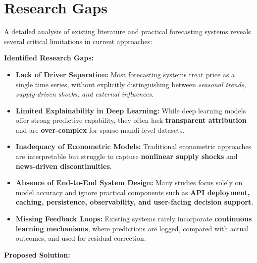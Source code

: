 \documentclass[12pt,a4paper]{report}
\begin{document}
\section{Research Gaps}

\noindent
A detailed analysis of existing literature and practical forecasting systems reveals several critical limitations in current approaches:
\vspace{0.5em}

\noindent
\textbf{Identified Research Gaps:}

\begin{itemize}
    \item \textbf{Lack of Driver Separation:}  
    Most forecasting systems treat price as a single time series, without explicitly distinguishing between \textit{seasonal trends, supply-driven shocks, and external influences}.

    \item \textbf{Limited Explainability in Deep Learning:}  
    While deep learning models offer strong predictive capability, they often lack \textbf{transparent attribution} and are \textbf{over-complex} for sparse mandi-level datasets.

    \item \textbf{Inadequacy of Econometric Models:}  
    Traditional econometric approaches are interpretable but struggle to capture \textbf{nonlinear supply shocks} and \textbf{news-driven discontinuities}.

    \item \textbf{Absence of End-to-End System Design:}  
    Many studies focus solely on model accuracy and ignore practical components such as \textbf{API deployment, caching, persistence, observability, and user-facing decision support}.

    \item \textbf{Missing Feedback Loops:}  
    Existing systems rarely incorporate \textbf{continuous learning mechanisms}, where predictions are logged, compared with actual outcomes, and used for residual correction.
\end{itemize}

\vspace{0.7em}

\noindent
\textbf{Proposed Solution:}  

\vspace{0.3em}
\end{document}

